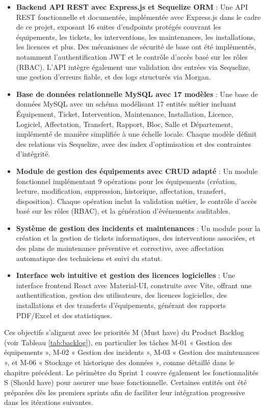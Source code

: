 \begin{itemize}
    \item \textbf{Backend API REST avec Express.js\cite{expressjs2024} et Sequelize ORM\cite{sequelize2024}} : Une API REST fonctionnelle et documentée, implémentée avec Express.js dans le cadre de ce projet, exposant 16 suites d'endpoints protégés couvrant les équipements, les tickets, les interventions, les maintenances, les installations, les licences et plus. Des mécanismes de sécurité de base ont été implémentés, notamment l’authentification JWT et le contrôle d’accès basé sur les rôles (RBAC). L'API intègre également une validation des entrées via Sequelize, une gestion d'erreurs fiable, et des logs structurés via Morgan.
    \item \textbf{Base de données relationnelle MySQL\cite{mysql2024} avec 17 modèles} : Une base de données MySQL avec un schéma modélisant 17 entités métier incluant Équipement, Ticket, Intervention, Maintenance, Installation, Licence, Logiciel, Affectation, Transfert, Rapport, Bloc, Salle et Département, implémenté de manière simplifiée à une échelle locale. Chaque modèle définit des relations via Sequelize, avec des index d’optimisation et des contraintes d’intégrité.
    \item \textbf{Module de gestion des équipements avec CRUD adapté} : Un module fonctionnel implémentant 9 opérations pour les équipements (création, lecture, modification, suppression, historique, affectation, transfert, disposition). Chaque opération inclut la validation métier, le contrôle d'accès basé sur les rôles (RBAC), et la génération d'événements auditables.
    \item \textbf{Système de gestion des incidents et maintenances} : Un module pour la création et la gestion de tickets informatiques, des interventions associées, et des plans de maintenance préventive et corrective, avec affectation automatique des techniciens et suivi du statut.
    \item \textbf{Interface web intuitive et gestion des licences logicielles} : Une interface frontend React\cite{react2024} avec Material-UI\cite{materialui2024}, construite avec Vite\cite{vite2024}, offrant une authentification, gestion des utilisateurs, des licences logicielles, des installations et des transferts d'équipements, générant des rapports PDF/Excel et des statistiques.
\end{itemize}

Ces objectifs s'alignent avec les priorités M (Must have) du Product Backlog (voir Tableau \ref{tab:backlog}), en particulier les tâches M-01 « Gestion des équipements », M-02 « Gestion des incidents », M-03 « Gestion des maintenances », et M-06 « Stockage et historique des données », comme détaillé dans le chapitre précédent. Le périmètre du Sprint 1 couvre également les fonctionnalités S (Should have) pour assurer une base fonctionnelle. Certaines entités ont été préparées dès les premiers sprints afin de faciliter leur intégration progressive dans les itérations suivantes.

